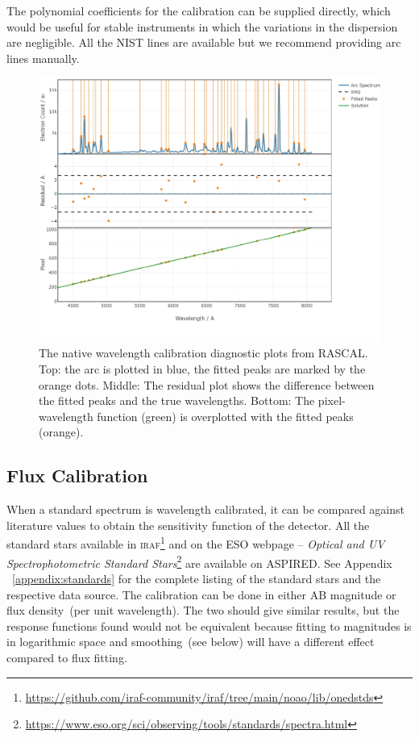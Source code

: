 \documentclass[twocolumn, linenumbers]{aastex631}
\begin{document}
The polynomial coefficients for the calibration can be supplied
directly, which would be useful for stable instruments in which
the variations in the dispersion are negligible. All the NIST lines
are available but we recommend providing arc lines manually.

\begin{figure}
    \centering
    \includegraphics[width=\columnwidth]{fig_05_wavelength_calibration_diagnostics.pdf}
    \caption{The native wavelength calibration diagnostic plots from RASCAL.
    Top: the arc is plotted in blue, the fitted peaks are marked by
    the orange dots. Middle: The residual plot shows the difference
    between the fitted peaks and the true wavelengths. Bottom: The
    pixel-wavelength function (green) is overplotted with the fitted
    peaks (orange).}
    \label{fig:wavecal}
\end{figure}

\subsection{Flux Calibration}
When a standard spectrum is wavelength calibrated, it can be
compared against literature values to obtain the sensitivity
function of the detector. All the standard stars available in
\textsc{iraf}\footnote{\url{https://github.com/iraf-community/iraf/tree/main/noao/lib/onedstds}}
and on the ESO webpage -- \textit{Optical and UV Spectrophotometric
Standard Stars}\footnote{\url{https://www.eso.org/sci/observing/tools/standards/spectra.html}}
are available on \textsc{ASPIRED}. See Appendix ~\ref{appendix:standards} for
the complete listing of the standard stars and the respective data
source. The calibration can be done in either AB magnitude or
flux density~(per unit wavelength). The two should give similar
results, but the response functions found would not be equivalent
because fitting to magnitudes is in logarithmic space and smoothing~(see
below) will have a different effect compared to flux fitting.
\end{document}
